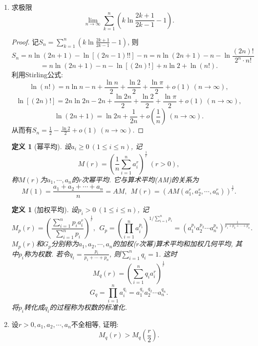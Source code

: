 \documentclass[UTF8,11pt, a4paper, oneside, fontset=none]{ctexbook}
\newtheorem{definition}[theorem]{定义}
\begin{document}
\begin{enumerate}

\item 求极限
\[
\lim_{n \to \infty} \sum_{k = 1}^n \left( k \ln \frac{2k+1}{2k-1} -1 \right).
\]


\begin{proof}


记$S_n =  \sum\limits_{k = 1}^n \left( k \ln \frac{2k+1}{2k-1} -1 \right)$, 则
\[
S_n = n \ln (2n + 1) - \ln [ (2n-1)!! ] - n = n \ln (2n+1) - n - \ln \frac{(2n)!}{2^n \cdot n!}
\]
\[
= n \ln (2n+1) - n - \ln [ (2n)! ] + n \ln 2 + \ln (n!).
\]
利用Stirling公式:
\[
\ln (n!) = n \ln n - n + \frac{\ln n}{2} + \frac{\ln 2}{2} + \frac{\ln \pi}{2} + o(1) \ (n \to \infty),
\]
\[
\ln [ (2n)! ] = 2n \ln 2n - 2n + \frac{\ln 2n}{2} + \frac{\ln 2}{2} +  \frac{\ln \pi}{2} + o(1) \ (n \to \infty),
\]
\[
\ln (2n+1) = \ln 2n + \frac{1}{2n} + o \left( \frac{1}{n} \right) \ (n \to \infty).
\]
从而有$S_n = \frac{1}{2} - \frac{\ln 2}{2} + o(1) \ (n \to \infty)$.
\end{proof}



\begin{definition}[幂平均]
设$a_i \geq 0 \ (1 \leq i \leq n)$, 记
\[
M(r) = \left( \frac{1}{n} \sum_{i=1}^n a_i^r \right)^{\frac{1}{r}} \ (r > 0),
\]
称$M(r)$为$a_1, \cdots, a_n$的$r$次幂平均. 它与算术平均(AM)的关系为
\[
M(1) = \frac{a_1 + a_2 + \cdots + a_n}{n} = AM, \ \ M(r) =( AM(a_1^r, a_2^r, \cdots, a_n^r))^{\frac{1}{r}}.
\]
\end{definition}


\begin{definition}[加权平均]
设$p_i > 0 \ (1 \leq i \leq n)$, 记
\[
M_p(r) = \left( \frac{ \sum_{i=1}^n p_i a_i^r }{\sum_{i=1}^n p_i} \right)^{\frac{1}{r}}, \ \
G_p = \left( \prod_{i=1}^n a_i^{p_i} \right)^{1 / \sum_{i=1}^n p_i} = (a_1^{p_1} a_2^{p_2} \cdots a_n^{p_n} )^{\frac{1}{p_1 + p_2 + \cdots + p_n}}.
\]
$M_p(r)$和$G_p$分别称为$a_1, a_2, \cdots, a_n$的加权($r$次幂)算术平均和加权几何平均, 其中$p_i$称为权数. 若令$q_i = \frac{p_i}{p_1 + \cdots + p_n}$, 则$\sum_{i=1}^n q_i =1$. 这时
\[
M_q(r) = \left( \sum_{i=1}^n q_i a_i^r \right)^{\frac{1}{r}}
\]
\[
G_q = \prod_{i=1}^n a_i^{q_i} = a_1^{q_1} a_2^{q_2} \cdots a_n^{q_n}. 
\]
将$p_i$转化成$q_i$的过程称为权数的标准化.

\end{definition}


\item 设$r > 0, a_1, a_2, \cdots, a_n$不全相等, 证明:
\[
M_q(r) > M_q\left(\frac{r}{2}\right).
\]



\end{enumerate}
\end{document}
